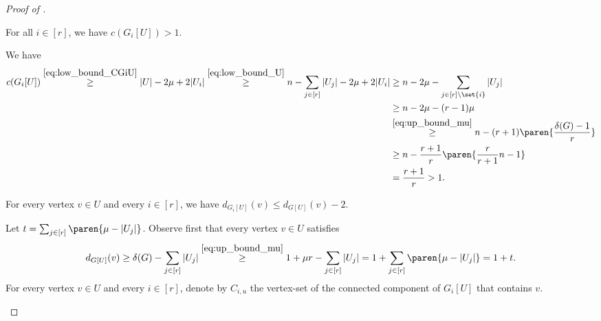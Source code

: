 \documentclass[10pt,a4paper,reqno]{amsart}
\begin{document}
\begin{proof}[Proof of ]
\begin{claim}\label{claim:at_least_2_comp_in_GiU}
    For all $i \in [r]$, we have $c(G_i[U]) > 1$.
\end{claim}
\begin{claimproof}
We have
\begin{align*}
      c(G_i[U]) \stackrel{\eqref{eq:low_bound_CGiU}}{\geq} |U| - 2\mu + 2|U_i| \stackrel{\eqref{eq:low_bound_U}}{\geq} n - \sum_{j \in [r]} |U_j| - 2\mu + 2|U_i| 
      &\geq n - 2\mu - \sum_{j \in [r] \setminus \set{i}} |U_j| \\
      &\geq n - 2\mu - (r - 1)\mu \\ 
      &\stackrel{\eqref{eq:up_bound_mu}}{\geq} n - (r + 1)\paren{\frac{\delta(G) - 1}{r}} \\
      &\geq n - \frac{r + 1}{r}\paren{\frac{r}{r + 1}n - 1} \\
      &= \frac{r + 1}{r} > 1.
\end{align*}
\end{claimproof}
\begin{claim}
\label{claim:no_monochromatic_vertex_inside_U}
    For every vertex $v \in U$ and every $i \in [r]$, we have $d_{G_i[U]}(v) \le d_{G[U]} (v) - 2$.
\end{claim}
\begin{claimproof}
Let $t = \sum_{j \in [r]} \paren{\mu - |U_j|}$. Observe first that every vertex $v \in U$ satisfies
\begin{equation}
      \label{eq:low_deg_GU_v}
      d_{G[U]}(v) \geq \delta(G) - \sum_{j \in [r]}|U_j| \stackrel{\eqref{eq:up_bound_mu}}{\geq} 1 + \mu r - \sum_{j \in [r]} |U_j| = 1 + \sum_{j \in [r]} \paren{\mu - |U_j|} = 1 + t.
\end{equation}
For every vertex $v \in U$ and every $i \in [r]$, denote by $C_{i, u}$ the vertex-set of the connected component of $G_i[U]$ that contains $v$.


\end{claimproof}
\end{proof}
\end{document}
